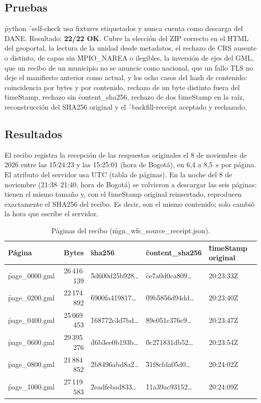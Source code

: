 \subsection{Pruebas}

\f{python}  \f{--self-check} usa fixtures etiquetados y nunca cuenta como descarga del DANE. Resultado: \textbf{22/22 OK}. Cubre la elección del ZIP correcto en el HTML del geoportal, la lectura de la unidad desde metadatos, el rechazo de CRS ausente o distinto, de capas sin \f{MPIO\_NAREA} o ilegibles, la inversión de ejes del GML, que un recibo de un municipio no se anuncie como nacional, que un fallo TLS no deje el manifiesto anterior como actual, y los ocho casos del hash de contenido: coincidencia por bytes y por contenido, rechazo de un byte distinto fuera del \f{timeStamp}, rechazo sin \f{content\_sha256}, rechazo de dos \f{timeStamp} en la raíz, reconstrucción del SHA256 original y el \f{--backfill-receipt} aceptado y rechazado.

\subsection{Resultados}

El recibo registra la recepción de las respuestas originales el 8 de noviembre de 2026 entre las 15:24:23 y las 15:25:01 (hora de Bogotá), en 6,4 a 8,5~s por página. El atributo del servidor usa UTC (tabla de páginas). En la noche del 8 de noviembre (21:38--21:40, hora de Bogotá) se volvieron a descargar las seis páginas: tienen el mismo tamaño y, con el \f{timeStamp} original reinsertado, reproducen exactamente el SHA256 del recibo. Es decir, son el mismo contenido; solo cambió la hora que escribe el servidor.

\begin{table}[htbp]
\centering\small
\caption{Páginas del recibo (\f{mgn\_wfs\_source\_receipt.json}).}
\begin{tabular}{@{}lrlll@{}}
\toprule
Página & Bytes & \f{sha256} & \f{content\_sha256} & \f{timeStamp} original \\
\midrule
\f{page\_0000.gml} & 26\,416\,139 & \f{5d600d25b928\ldots} & \f{ce7a0d0ca809\ldots} & 20:23:33Z \\
\f{page\_0200.gml} & 22\,174\,892 & \f{6900fa419817\ldots} & \f{09b5856d94dd\ldots} & 20:23:40Z \\
\f{page\_0400.gml} & 25\,069\,453 & \f{168772c3d7bd\ldots} & \f{89e051c376c9\ldots} & 20:23:47Z \\
\f{page\_0600.gml} & 29\,395\,276 & \f{d6b3ee0b193b\ldots} & \f{0c271831db52\ldots} & 20:23:54Z \\
\f{page\_0800.gml} & 21\,884\,852 & \f{2b8496abd8a2\ldots} & \f{31f8cfda05d0\ldots} & 20:24:02Z \\
\f{page\_1000.gml} & 27\,119\,583 & \f{2eadfebad833\ldots} & \f{11a39ac93152\ldots} & 20:24:09Z \\
\bottomrule
\end{tabular}
\end{table}

